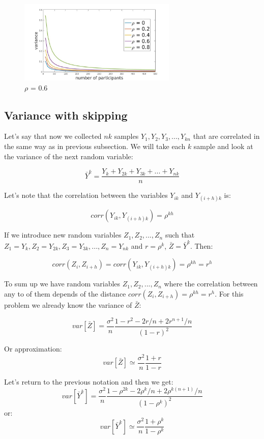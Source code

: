 \documentclass[12pt]{report}
\begin{document}
\begin{figure}[ht]
    \centering
    \includegraphics[height=150px]{varianceIndDep2}
    \caption{ $\rho$ = 0.6 }
    \label{fig:diffCorr}
\end{figure}


\subsection{Variance with skipping}

Let's say that now we collected $nk$ samples $Y_1, Y_2, Y_3, ..., Y_{kn}$ that are correlated in the same way as in previous subsection. We  will take each $k$ sample and look at the variance of the next random variable:

$$\bar{Y}^k = \frac{Y_k + Y_{2k} + Y_{3k} + ... + Y_{nk}}{n}$$

Let's note that the correlation between the variables $Y_{ik}$ and $Y_{(i+h)k}$ is: 

 $$corr(Y_{ik}, Y_{(i+h)k}) = \rho^{kh}$$

If we introduce new random variables $Z_1, Z_2, ..., Z_n$ such that $Z_1 = Y_k, Z_2 = Y_{2k}, Z_3 = Y_{3k},..., Z_n = Y_{nk}$ and $r = \rho^k$, $\bar{Z}= \bar{Y}^k$. Then:

$$corr(Z_i, Z_{i+h}) = corr(Y_{ik}, Y_{(i+h)k}) = \rho^{kh} = r^h$$

To sum up we have random variables $Z_1, Z_2, ..., Z_n$ where the correlation between any to of them depends of the distance $corr(Z_i, Z_{i+h}) = \rho^{kh} = r^h$. For this problem we already know the variance of $\bar{Z}$:


$$ var\left[\bar{Z} \right] = \frac{\sigma^2}{n}\frac{1-r^2 - 2r/n + 2r^{n+1}/n}{(1-r)^2}$$

Or approximation:
$$var\left[\bar{Z} \right] \simeq  \frac{\sigma^2}{n} \frac{1+r}{1-r}$$



Let's return to the previous notation and then we get:
$$var\left[\bar{Y}^k \right] = \frac{\sigma^2}{n}\frac{1-\rho^{2k} - 2\rho^k/n + 2\rho^{k(n+1)}/n}{(1-\rho^k)^2}$$
or:
$$var\left[\bar{Y}^k \right] \simeq  \frac{\sigma^2}{n} \frac{1+\rho^k}{1-\rho^k}$$
\end{document}
